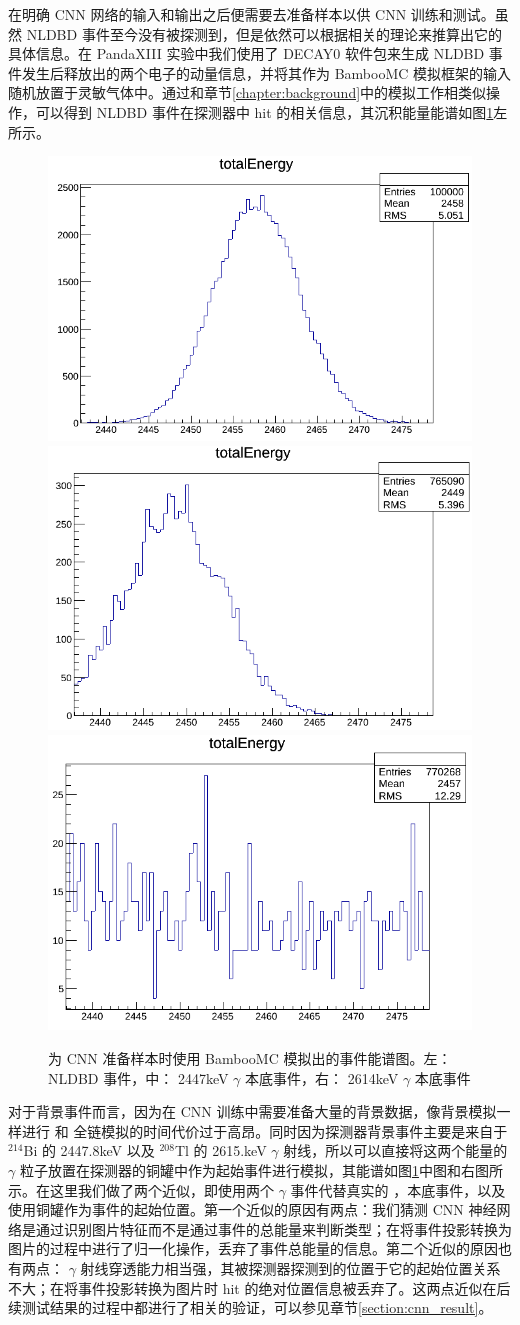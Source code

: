 在明确 CNN 网络的输入和输出之后便需要去准备样本以供 CNN 训练和测试。虽然 NLDBD 事件至今没有被探测到，但是依然可以根据相关的理论来推算出它的具体信息。在 PandaXIII 实验中我们使用了 DECAY0 软件包\supercite{ponkratenko2000event}来生成 NLDBD 事件发生后释放出的两个电子的动量信息，并将其作为 BambooMC 模拟框架的输入随机放置于灵敏气体中。通过和章节\ref{chapter:background}中的模拟工作相类似操作，可以得到 NLDBD 事件在探测器中 hit 的相关信息，其沉积能量能谱如图\ref{fig:nldbd_energy}左所示。

\begin{figure}
    \centering
    \includegraphics[width=0.3\columnwidth]{pic/nldbd_raw_spectrum.png}
    \includegraphics[width=0.3\columnwidth]{pic/2447_raw_spectrum.png}
    \includegraphics[width=0.3\columnwidth]{pic/2614_raw_spectrum.png}
    \caption{为 CNN 准备样本时使用 BambooMC 模拟出的事件能谱图。左： NLDBD 事件，中： 2447keV $\gamma$ 本底事件，右： 2614keV $\gamma$ 本底事件}
    \label{fig:nldbd_energy}
\end{figure}

对于背景事件而言，因为在 CNN 训练中需要准备大量的背景数据，像背景模拟一样进行 \utte 和 \thttt 全链模拟的时间代价过于高昂。同时因为探测器背景事件主要是来自于 $^{214}$Bi 的 2447.8keV 以及 $^{208}$Tl 的 2615.keV $\gamma$ 射线，所以可以直接将这两个能量的 $\gamma$ 粒子放置在探测器的铜罐中作为起始事件进行模拟，其能谱如图\ref{fig:nldbd_energy}中图和右图所示。在这里我们做了两个近似，即使用两个 $\gamma$ 事件代替真实的 \utte，\thttt 本底事件，以及使用铜罐作为事件的起始位置。第一个近似的原因有两点：我们猜测 CNN 神经网络是通过识别图片特征而不是通过事件的总能量来判断类型；在将事件投影转换为图片的过程中进行了归一化操作，丢弃了事件总能量的信息。第二个近似的原因也有两点： $\gamma$ 射线穿透能力相当强，其被探测器探测到的位置于它的起始位置关系不大；在将事件投影转换为图片时 hit 的绝对位置信息被丢弃了。这两点近似在后续测试结果的过程中都进行了相关的验证，可以参见章节\ref{section:cnn_result}。

